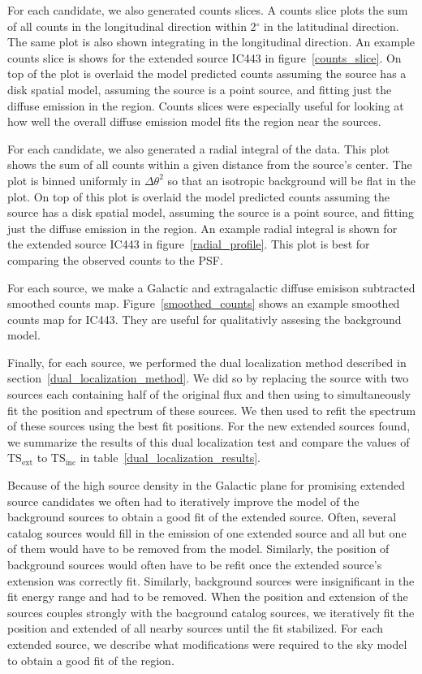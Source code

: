 \documentclass[12pt,preprint]{aastex}
\newcommand{\tsext}{{\ensuremath{\text{TS}_\text{ext}}}\xspace}
\newcommand{\tsinc}{\ensuremath{\text{TS}_\text{inc}}\xspace}
\renewcommand{\deg}{\ensuremath{^\circ}\xspace}
\newcommand{\pointlike}{\text{\em pointlike}\xspace}
\newcommand{\gtlike}{\text{\em gtlike}\xspace}
\begin{document}
For each candidate, we also generated counts slices. A counts slice
plots the sum of all counts in the longitudinal direction within 2\deg
in the latitudinal direction.  The same plot is also shown integrating
in the longitudinal direction.   An example counts slice is shows for the extended source
IC443 in figure~\ref{counts_slice}. 
On top of the plot is overlaid the model
predicted counts assuming the source has a disk spatial model, assuming
the source is a point source, and fitting just the diffuse emission in
the region. 
Counts slices were especially useful
for looking at how well the overall diffuse emission model fits the
region near the sources.

For each candidate, we also generated a radial integral of the data. This
plot shows the sum of all counts within a given distance from the
source's center. The plot is binned uniformly in $\Delta \theta^2$ so
that an isotropic background will be flat in the plot. On top of this
plot is overlaid the model predicted counts assuming the source has a
disk spatial model, assuming the source is a point source, and fitting
just the diffuse emission in the region. An example radial integral
is shown for the extended source IC443 in figure~\ref{radial_profile}.
This plot is best for comparing the observed counts to the PSF.

For each source, we make a Galactic and extragalactic diffuse emisison
subtracted smoothed counts map. Figure~\ref{smoothed_counts} shows an
example smoothed counts map for IC443. They are useful for qualitativly
assesing the background model.

Finally, for each source, we performed the dual localization method
described in section~\ref{dual_localization_method}.  We did so by
replacing the source with two sources each containing half of the original
flux and then using \pointlike to simultaneously fit the position and
spectrum of these sources.  We then used \gtlike to refit the spectrum of
these sources using the best fit positions. For the new extended sources
found, we summarize the results of this dual localization test and compare
the values of \tsext to \tsinc in table~\ref{dual_localization_results}.

Because of the high source density in the Galactic plane for promising
extended source candidates we often had to iteratively improve the model
of the background sources to obtain a good fit of the extended source.
Often, several catalog sources would fill in the emission of one
extended source and all but one of them would have to be removed from
the model. Similarly, the position of background sources would often
have to be refit once the extended source's extension was correctly
fit. Similarly, background sources were insignificant in the fit
energy range and had to be removed.  When the position and extension
of the sources couples strongly with the bacground catalog sources, we
iteratively fit the position and extended of all nearby sources until the
fit stabilized.  For each extended source, we describe what modifications
were required to the sky model to obtain a good fit of the region.
\end{document}
